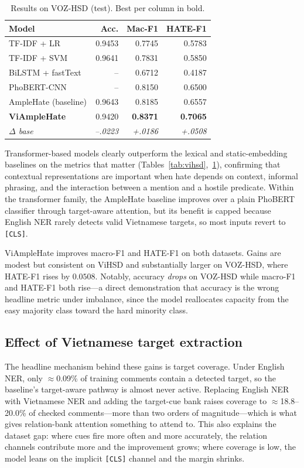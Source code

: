 \documentclass[11pt]{article}
\begin{document}
\begin{table}[t]
  \centering
  \small
  \begin{tabular}{lrrr}
    \toprule
    \textbf{Model} & \textbf{Acc.} & \textbf{Mac-F1} & \textbf{HATE-F1} \\
    \midrule
    TF-IDF + LR          & 0.9453 & 0.7745 & 0.5783 \\
    TF-IDF + SVM         & 0.9641 & 0.7831 & 0.5850 \\
    BiLSTM + fastText    & --     & 0.6712 & 0.4187 \\
    PhoBERT-CNN          & --     & 0.8150 & 0.6500 \\
    AmpleHate (baseline) & 0.9643 & 0.8185 & 0.6557 \\
    \textbf{ViAmpleHate} & 0.9420 & \textbf{0.8371} & \textbf{0.7065} \\
    \textit{$\Delta$ base} & \textit{--.0223} & \textit{+.0186} & \textit{+.0508} \\
    \bottomrule
  \end{tabular}
  \caption{Results on VOZ-HSD (test). Best per column in bold.}
  \label{tab:voz}
\end{table}

Transformer-based models clearly outperform the lexical and static-embedding baselines on the metrics that matter (Tables~\ref{tab:vihsd},~\ref{tab:voz}), confirming that contextual representations are important when hate depends on context, informal phrasing, and the interaction between a mention and a hostile predicate. Within the transformer family, the AmpleHate baseline improves over a plain PhoBERT classifier through target-aware attention, but its benefit is capped because English NER rarely detects valid Vietnamese targets, so most inputs revert to \texttt{[CLS]}.

ViAmpleHate improves macro-F1 and HATE-F1 on both datasets. Gains are modest but consistent on ViHSD and substantially larger on VOZ-HSD, where HATE-F1 rises by $0.0508$. Notably, accuracy \emph{drops} on VOZ-HSD while macro-F1 and HATE-F1 both rise---a direct demonstration that accuracy is the wrong headline metric under imbalance, since the model reallocates capacity from the easy majority class toward the hard minority class.

\subsection{Effect of Vietnamese target extraction}
\label{sec:coverage}
The headline mechanism behind these gains is target coverage. Under English NER, only $\approx$0.09\% of training comments contain a detected target, so the baseline's target-aware pathway is almost never active. Replacing English NER with Vietnamese NER and adding the target-cue bank raises coverage to $\approx$18.8--20.0\% of checked comments---more than two orders of magnitude---which is what gives relation-bank attention something to attend to. This also explains the dataset gap: where cues fire more often and more accurately, the relation channels contribute more and the improvement grows; where coverage is low, the model leans on the implicit \texttt{[CLS]} channel and the margin shrinks.
\end{document}
